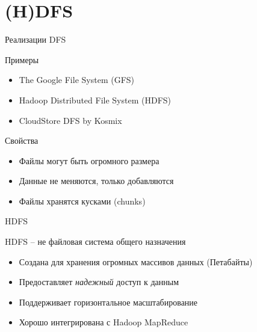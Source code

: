 \documentclass[10pt,a4paper]{beamer}
\begin{document}

\section{(H)DFS}


\begin{frame}{Реализации DFS}

Примеры
\begin{itemize}
\item The Google File System (GFS)
\item Hadoop Distributed File System (HDFS)
\item CloudStore DFS by Kosmix
\end{itemize}

Свойства
\begin{itemize}
\item Файлы могут быть огромного размера
\item Данные не меняются, только добавляются
\item Файлы хранятся кусками (chunks)
\end{itemize}

\end{frame}


\begin{frame}{HDFS}

{\color{red} HDFS -- не файловая система общего назначения}
\begin{itemize}
\item Создана для хранения огромных массивов данных (Петабайты)
\item Предоставляет {\it надежный} доступ к данным
\item Поддерживает горизонтальное масштабирование
\item Хорошо интегрирована с Hadoop MapReduce
\end{itemize}

\end{frame}

\end{document}
